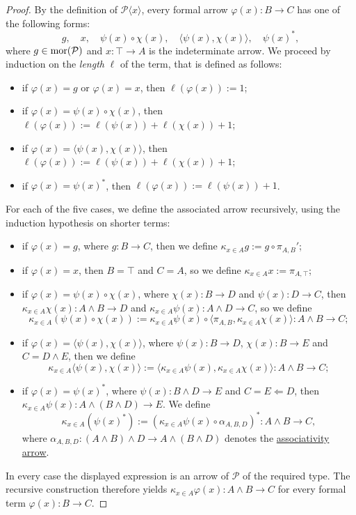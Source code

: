 \begin{proof}
    By the definition of $\mathcal P\langle x\rangle$, every formal arrow $\varphi(x) : B \to C$ has one of the following forms:
    \[ g,\quad x,\quad \psi(x) \circ \chi(x),\quad \langle \psi(x),\chi(x)\rangle,\quad \psi(x)^*, \]
    where $g \in \operatorname{mor}(\mathcal P)$ and $x : \top \to A$ is the indeterminate arrow. We proceed by induction on the \emph{length} $\ell$ of the term, that is defined as follows:
    \begin{itemize}
        \item if $\varphi(x) = g$ or $\varphi(x) = x$, then $\ell(\varphi(x)) := 1$;
        \item if $\varphi(x) = \psi(x) \circ \chi(x)$, then $\ell(\varphi(x)) := \ell(\psi(x)) + \ell(\chi(x)) + 1$;
        \item if $\varphi(x) = \langle \psi(x), \chi(x)\rangle$, then $\ell(\varphi(x)) := \ell(\psi(x)) + \ell(\chi(x)) + 1$;
        \item if $\varphi(x) = \psi(x)^*$, then $\ell(\varphi(x)) := \ell(\psi(x)) + 1$.
    \end{itemize}
    For each of the five cases, we define the associated arrow recursively, using the induction hypothesis on shorter terms:
    \begin{itemize}
        \item if $\varphi(x) = g$, where $g : B \to C$, then we define $\kappa_{x \in A}g := g \circ \pi_{A,B}'$;
        \item if $\varphi(x) = x$, then $B = \top$ and $C = A$, so we define $\kappa_{x \in A}x := \pi_{A,\top}$;
        \item if $\varphi(x) = \psi(x) \circ \chi(x)$, where $\chi(x) : B \to D$ and $\psi(x) : D \to C$, then $\kappa_{x \in A}\chi(x) : A \land B \to D$ and $\kappa_{x \in A}\psi(x) : A \land D \to C$, so we define
        \[ \kappa_{x \in A} (\psi(x) \circ \chi(x)) := \kappa_{x \in A} \psi(x) \circ \langle \pi_{A,B}, \kappa_{x \in A} \chi(x)\rangle : A \land B \to C; \]
        \item if $\varphi(x) = \langle \psi(x), \chi(x)\rangle$, where $\psi(x) : B \to D$, $\chi(x) : B \to E$ and $C = D \land E$, then we define
        \[ \kappa_{x \in A} \langle \psi(x), \chi(x)\rangle := \langle \kappa_{x \in A} \psi(x), \kappa_{x \in A} \chi(x)\rangle : A \land B \to C; \]
        \item if $\varphi(x) = \psi(x)^*$, where $\psi(x) : B \land D \to E$ and $C = E \Leftarrow D$, then $\kappa_{x \in A}\psi(x) : A \land (B \land D) \to E$. We define
        \[ \kappa_{x \in A}(\psi(x)^*) := (\kappa_{x \in A}\psi(x) \circ \alpha_{A,B,D})^* : A \land B \to C, \]
        where $\alpha_{A,B,D} : (A \land B) \land D \to A \land (B \land D)$ denotes the \hyperref[ex:associativity-of-conjunction]{associativity arrow}.
    \end{itemize}
    In every case the displayed expression is an arrow of $\mathcal P$ of the required type. The recursive construction therefore yields
    $\kappa_{x \in A}\varphi(x) : A \land B \to C$ for every formal term $\varphi(x) : B \to C$.
\end{proof}

